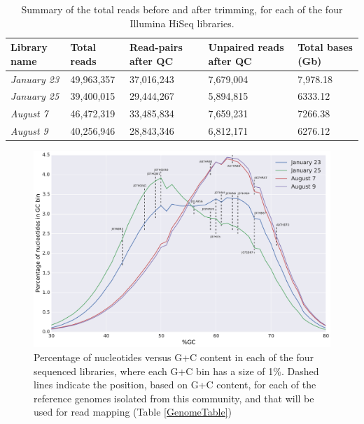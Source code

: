 \begin{table}[hbt]
  \caption{Summary of the total reads before and after trimming, for each of the four Illumina HiSeq libraries.}
  \begin{tabularx}{\textwidth}{L{2.2cm}R{2cm}R{3cm}R{3.2cm}R{2cm}}
  \hline
    \textbf{Library name} & \textbf{Total reads} & \textbf{Read-pairs after QC} & \textbf{Unpaired reads after QC} & \textbf{Total bases (Gb)} \\
    \hline 
    \textit{January 23} & 49,963,357 & 37,016,243 & 7,679,004 & 7,978.18\\
    \textit{January 25} & 39,400,015 & 29,444,267 & 5,894,815 & 6333.12 \\
    \textit{August 7} & 46,472,319 & 33,485,834 & 7,659,231 & 7266.38 \\
    \textit{August 9} & 40,256,946 & 28,843,346 & 6,812,171 & 6276.12 \\
  \end{tabularx}
  \label{LibSequenceQC}
\end{table}

\begin{figure}[!hbtp]
  \centering
  \includegraphics[width=\textwidth]{Chapter5/Figures/GC_content_HiSeqLibs.pdf}
  \caption{Percentage of nucleotides versus G+C content in each of the four sequenced libraries, where each G+C bin has a size of 1\%. Dashed lines indicate the position, based on G+C content, for each of the reference genomes isolated from this community, and that will be used for read mapping (Table \ref{GenomeTable})}
  \label{ReadsGCplot}
\end{figure}

